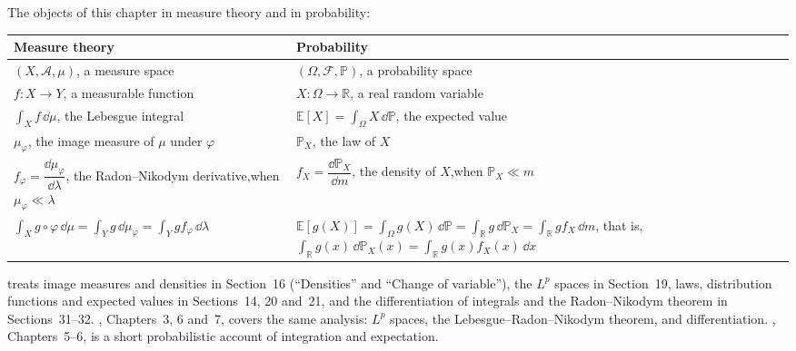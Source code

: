 \begin{remark}[Dictionary]\label{rem:ld-dictionary}
The objects of this chapter in measure theory and in probability:
\begin{center}
\small
\renewcommand{\arraystretch}{1.5}
\begin{tabular}{@{}p{}p{}@{}}
\toprule
Measure theory & Probability\\
\midrule
$(X,\mathcal A,\mu)$, a measure space & $(\Omega,\mathcal F,\mathbb P)$, a probability space\\
$f:X\to Y$, a measurable function & $X:\Omega\to\mathbb R$, a real random variable\\
$\int_Xf\,\dd\mu$, the Lebesgue integral & $\mathbb E[X]=\int_\Omega X\,\dd\mathbb P$, the expected value\\
$\mu_\varphi$, the image measure of $\mu$ under $\varphi$ & $\mathbb P_X$, the law of $X$\\
$f_\varphi=\dfrac{\dd\mu_\varphi}{\dd\lambda}$, the Radon--Nikodym derivative,\newline when $\mu_\varphi\ll\lambda$
  & $f_X=\dfrac{\dd\mathbb P_X}{\dd m}$, the density of $X$,\newline when $\mathbb P_X\ll m$\\
$\displaystyle\int_Xg\circ\varphi\,\dd\mu=\int_Yg\,\dd\mu_\varphi=\int_Ygf_\varphi\,\dd\lambda$
  & $\displaystyle\mathbb E[g(X)]=\int_\Omega g(X)\,\dd\mathbb P=\int_{\mathbb R}g\,\dd\mathbb P_X=\int_{\mathbb R}gf_X\,\dd m$,\newline
    that is, $\displaystyle\int_{\mathbb R}g(x)\,\dd\mathbb P_X(x)=\int_{\mathbb R}g(x)f_X(x)\,\dd x$\\
\bottomrule
\end{tabular}
\end{center}
\end{remark}

\furtherreading
\textcite{billingsley} treats image measures and densities in Section~16 (``Densities'' and
``Change of variable''), the $L^p$ spaces in Section~19, laws, distribution functions and
expected values in Sections~14, 20 and~21, and the differentiation of integrals and the
Radon--Nikodym theorem in Sections~31--32. \textcite{rudin-rca}, Chapters~3, 6 and~7, covers
the same analysis: $L^p$ spaces, the Lebesgue--Radon--Nikodym theorem, and differentiation.
\textcite{williams}, Chapters~5--6, is a short probabilistic account of integration and
expectation.
